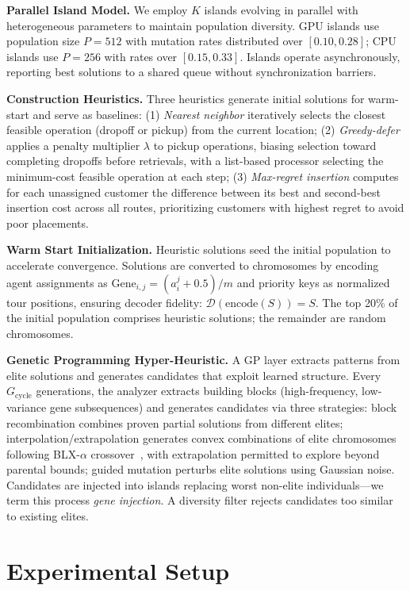 \documentclass[sigconf]{acmart}
\begin{document}
\textbf{Parallel Island Model.} We employ $K$ islands evolving in parallel with heterogeneous parameters to maintain population diversity. GPU islands use population size $P=512$ with mutation rates distributed over $[0.10, 0.28]$; CPU islands use $P=256$ with rates over $[0.15, 0.33]$. Islands operate asynchronously, reporting best solutions to a shared queue without synchronization barriers.

\textbf{Construction Heuristics.} Three heuristics generate initial solutions for warm-start and serve as baselines: (1) \emph{Nearest neighbor} iteratively selects the closest feasible operation (dropoff or pickup) from the current location; (2) \emph{Greedy-defer} applies a penalty multiplier $\lambda$ to pickup operations, biasing selection toward completing dropoffs before retrievals, with a list-based processor selecting the minimum-cost feasible operation at each step; (3) \emph{Max-regret insertion} computes for each unassigned customer the difference between its best and second-best insertion cost across all routes, prioritizing customers with highest regret to avoid poor placements.

\textbf{Warm Start Initialization.} Heuristic solutions seed the initial population to accelerate convergence. Solutions are converted to chromosomes by encoding agent assignments as $\text{Gene}_{i,j} = (a_i^j + 0.5)/m$ and priority keys as normalized tour positions, ensuring decoder fidelity: $\mathcal{D}(\text{encode}(S)) = S$. The top 20\% of the initial population comprises heuristic solutions; the remainder are random chromosomes.

\textbf{Genetic Programming Hyper-Heuristic.} A GP layer extracts patterns from elite solutions and generates candidates that exploit learned structure. Every $G_{\text{cycle}}$ generations, the analyzer extracts building blocks (high-frequency, low-variance gene subsequences) and generates candidates via three strategies: block recombination combines proven partial solutions from different elites; interpolation/extrapolation generates convex combinations of elite chromosomes following BLX-$\alpha$ crossover~\cite{eshelman1993real}, with extrapolation permitted to explore beyond parental bounds; guided mutation perturbs elite solutions using Gaussian noise. Candidates are injected into islands replacing worst non-elite individuals---we term this process \emph{gene injection}. A diversity filter rejects candidates too similar to existing elites.

\section{Experimental Setup}
\label{sec:experiments}
\end{document}
